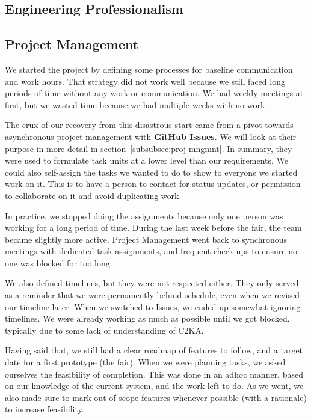 
\subsection{Engineering Professionalism}\label{subsec:engineering-professionalism}

\subsection{Project Management}\label{subsec:project-management}
We started the project by defining some processes for baseline communication and work hours.
That strategy did not work well because we still faced long periods of time without any work or communication.
We had weekly meetings at first, but we wasted time because we had multiple weeks with no work.

The crux of our recovery from this disastrous start came from a pivot towards asynchronous project management with \textbf{GitHub Issues}.
We will look at their purpose in more detail in section~\ref{subsubsec:proj-mngmnt}.
In summary, they were used to formulate task units at a lower level than our requirements.
We could also self-assign the tasks we wanted to do to show to everyone we started work on it.
This is to have a person to contact for status updates, or permission to collaborate on it and avoid duplicating work.

In practice, we stopped doing the assignments because only one person was working for a long period of time.
During the last week before the fair, the team became slightly more active.
Project Management went back to synchronous meetings with dedicated task assignments,
and frequent check-ups to ensure no one was blocked for too long.

We also defined timelines, but they were not respected either.
They only served as a reminder that we were permanently behind schedule, even when we revised our timeline later.
When we switched to Issues, we ended up somewhat ignoring timelines.
We were already working as much as possible until we got blocked, typically due to some lack of understanding of C2KA\@.

Having said that, we still had a clear roadmap of features to follow, and a target date for a first prototype (the fair).
When we were planning tasks, we asked ourselves the feasibility of completion.
This was done in an adhoc manner, based on our knowledge of the current system, and the work left to do.
As we went, we also made sure to mark out of scope features whenever possible (with a rationale) to increase feasibility.
